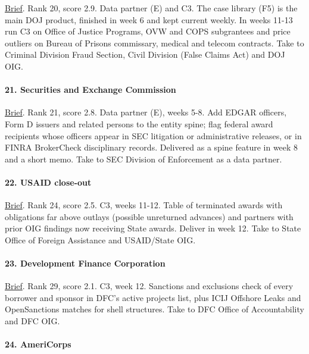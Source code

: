 \documentclass[letterpaper,11pt]{article}
\begin{document}
\href{agencies/doj.pdf}{Brief}. Rank 20, score 2.9. Data partner (E) and
C3. The case library (F5) is the main DOJ product, finished in week 6
and kept current weekly. In weeks 11-13 run C3 on Office of Justice
Programs, OVW and COPS subgrantees and price outliers on Bureau of
Prisons commissary, medical and telecom contracts. Take to Criminal
Division Fraud Section, Civil Division (False Claims Act) and DOJ OIG.

\hypertarget{securities-and-exchange-commission}{%
\paragraph{21. Securities and Exchange
Commission}\label{securities-and-exchange-commission}}

\href{agencies/sec.pdf}{Brief}. Rank 21, score 2.8. Data partner (E),
weeks 5-8. Add EDGAR officers, Form D issuers and related persons to the
entity spine; flag federal award recipients whose officers appear in SEC
litigation or administrative releases, or in FINRA BrokerCheck
disciplinary records. Delivered as a spine feature in week 8 and a short
memo. Take to SEC Division of Enforcement as a data partner.

\hypertarget{usaid-close-out}{%
\paragraph{22. USAID close-out}\label{usaid-close-out}}

\href{agencies/usaid.pdf}{Brief}. Rank 24, score 2.5. C3, weeks 11-12.
Table of terminated awards with obligations far above outlays (possible
unreturned advances) and partners with prior OIG findings now receiving
State awards. Deliver in week 12. Take to State Office of Foreign
Assistance and USAID/State OIG.

\hypertarget{development-finance-corporation}{%
\paragraph{23. Development Finance
Corporation}\label{development-finance-corporation}}

\href{agencies/dfc.pdf}{Brief}. Rank 29, score 2.1. C3, week 12.
Sanctions and exclusions check of every borrower and sponsor in DFC's
active projects list, plus ICIJ Offshore Leaks and OpenSanctions matches
for shell structures. Take to DFC Office of Accountability and DFC OIG.

\hypertarget{americorps}{%
\paragraph{24. AmeriCorps}\label{americorps}}
\end{document}
